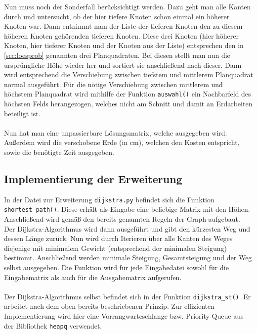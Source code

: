 \documentclass[a4paper, notitlepage, 12pt]{scrartcl}
\begin{document}
Nun muss noch der Sonderfall berücksichtigt werden. Dazu geht man alle Kanten durch und untersucht, ob der hier tiefere Knoten schon einmal ein höherer Knoten war. Dann entnimmt man der Liste der tieferen Knoten den zu diesem höheren Knoten gehörenden tieferen Knoten. Diese drei Knoten (hier höherer Knoten, hier tieferer Knoten und der Knoten aus der Liste) entsprechen den in \autoref{sec:loesprob} genannten drei Planquadraten. Bei diesen stellt man nun die ursprüngliche Höhe wieder her und sortiert sie anschließend nach dieser. Dann wird entsprechend die Verschiebung zwischen tiefstem und mittlerem Planquadrat normal ausgeführt. Für die nötige Verschiebung zwischen mittlerem und höchstem Planquadrat wird mithilfe der Funktion \texttt{auswahl()} ein Nachbarfeld des höchsten Felds herangezogen, welches nicht am Schnitt und damit an Erdarbeiten beteiligt ist. \\ \\
Nun hat man eine unpassierbare Lösungsmatrix, welche ausgegeben wird. Außerdem wird die verschobene Erde (in cm), welchen den Kosten entspricht, sowie die benötigte Zeit ausgegeben.
\subsection{Implementierung der Erweiterung}
In der Datei zur Erweiterung \texttt{dijkstra.py} befindet sich die Funktion \texttt{shortest\_path()}. Diese erhält als Eingabe eine beliebige Matrix mit den Höhen. Anschließend wird gemäß den bereits genannten Regeln der Graph aufgebaut. Der Dijkstra-Algorithmus wird dann ausgeführt und gibt den kürzesten Weg und dessen Länge zurück. Nun wird durch Iterieren über alle Kanten des Weges diejenige mit minimalem Gewicht (entsprechend der minimalen Steigung) bestimmt. Anschließend werden minimale Steigung, Gesamtsteigung und der Weg selbst ausgegeben. Die Funktion wird für jede Eingabedatei sowohl für die Eingabematrix als auch für die Ausgabematrix aufgerufen. \\ \\
Der Dijkstra-Algorithmus selbst befindet sich in der Funktion \texttt{dijkstra\_st()}. Er arbeitet nach dem oben bereits beschriebenen Prinzip. Zur effizienten Implementierung wird hier eine Vorrangwarteschlange bzw. Priority Queue aus der Bibliothek \texttt{heapq} verwendet.
 \newpage
\end{document}
